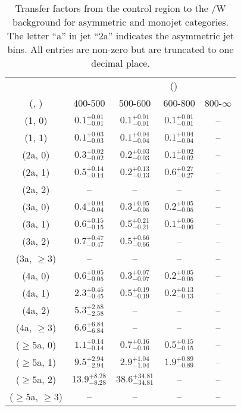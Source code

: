 \begin{table}[h!]
\tiny
\centering
\caption{Transfer factors from the \gj control region to the \ttbar/W background for asymmetric and monojet categories. The letter ``a'' in jet \eg ``2a''  indicates the asymmetric jet bins. All entries are non-zero but are truncated to one decimal place.\label{tab:tf_gj_ttw_asym}}
\begin{tabular}
{ccccc}
	\hline\hline
&	& \multicolumn{4}{c}{\scalht (\gev)} \\ 
	 (\njet,  \nb) & 400-500 & 500-600 & 600-800 & 800-$\infty$ \\ [0.8ex] 
\hline
	(1, 0) & $0.1^{+ 0.01 }_{- 0.01 }$ & $0.1^{+ 0.01 }_{- 0.01 }$ & $0.1^{+ 0.01 }_{- 0.01 }$ & -- \\[0.5ex] 
	(1, 1) & $0.1^{+ 0.03 }_{- 0.03 }$ & $0.1^{+ 0.04 }_{- 0.04 }$ & $0.1^{+ 0.04 }_{- 0.04 }$ & -- \\[0.5ex] 
	(2a, 0) & $0.3^{+ 0.02 }_{- 0.02 }$ & $0.2^{+ 0.03 }_{- 0.03 }$ & $0.1^{+ 0.02 }_{- 0.02 }$ & -- \\[0.5ex] 
	(2a, 1) & $0.5^{+ 0.14 }_{- 0.14 }$ & $0.2^{+ 0.13 }_{- 0.13 }$ & $0.6^{+ 0.27 }_{- 0.27 }$ & -- \\[0.5ex] 
	(2a, 2) & -- & -- & -- & -- \\[0.5ex] 
	(3a, 0) & $0.4^{+ 0.04 }_{- 0.04 }$ & $0.3^{+ 0.05 }_{- 0.05 }$ & $0.2^{+ 0.05 }_{- 0.05 }$ & -- \\[0.5ex] 
	(3a, 1) & $0.6^{+ 0.15 }_{- 0.15 }$ & $0.5^{+ 0.21 }_{- 0.21 }$ & $0.1^{+ 0.06 }_{- 0.06 }$ & -- \\[0.5ex] 
	(3a, 2) & $0.7^{+ 0.47 }_{- 0.47 }$ & $0.5^{+ 0.66 }_{- 0.66 }$ & -- & -- \\[0.5ex] 
	(3a, $\ge3$) & -- & -- & -- & -- \\[0.5ex] 
	(4a, 0) & $0.6^{+ 0.05 }_{- 0.05 }$ & $0.3^{+ 0.07 }_{- 0.07 }$ & $0.2^{+ 0.05 }_{- 0.05 }$ & -- \\[0.5ex] 
	(4a, 1) & $2.3^{+ 0.45 }_{- 0.45 }$ & $0.5^{+ 0.19 }_{- 0.19 }$ & $0.2^{+ 0.13 }_{- 0.13 }$ & -- \\[0.5ex] 
	(4a, 2) & $5.3^{+ 2.58 }_{- 2.58 }$ & -- & -- & -- \\[0.5ex] 
	(4a, $\ge3$) & $6.6^{+ 6.84 }_{- 6.84 }$ & -- & -- & -- \\[0.5ex] 
	($\ge5$a, 0) & $1.1^{+ 0.14 }_{- 0.14 }$ & $0.7^{+ 0.16 }_{- 0.16 }$ & $0.5^{+ 0.15 }_{- 0.15 }$ & -- \\[0.5ex] 
	($\ge5$a, 1) & $9.5^{+ 2.94 }_{- 2.94 }$ & $2.9^{+ 1.04 }_{- 1.04 }$ & $1.9^{+ 0.89 }_{- 0.89 }$ & -- \\[0.5ex] 
	($\ge5$a, 2) & $13.9^{+ 8.28 }_{- 8.28 }$ & $38.6^{+ 34.81 }_{- 34.81 }$ & -- & -- \\[0.5ex] 
	($\ge5$a, $\ge3$) & -- & -- & -- & -- \\[0.5ex] 
	\hline
	\hline
\end{tabular}
\end{table}
